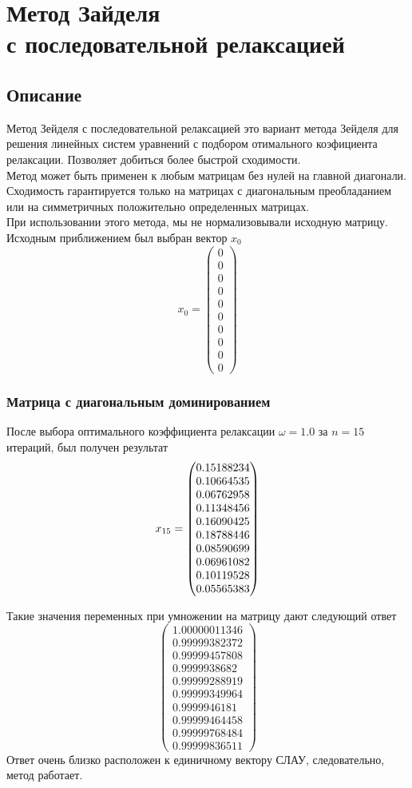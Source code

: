 \documentclass[../../report.tex]{subfiles}
\begin{document}
\chapter[Метод Зайделя с последовательной релаксацией]{\texorpdfstring{Метод Зайделя \\
с последовательной релаксацией}{Метод Зайделя с последовательной релаксацией}}

\section{Описание}
Метод Зейделя с последовательной релаксацией это вариант метода Зейделя для решения линейных систем
уравнений с подбором отимального коэфициента релаксации. Позволяет добиться  более быстрой сходимости. \\

Метод может быть применен к любым матрицам без нулей на главной диагонали. Сходимость гарантируется только на
матрицах с диагональным преобладанием или на симметричных положительно определенных матрицах. \\

При использовании этого метода, мы не нормализовывали исходную матрицу. \\

Исходным приближением был выбран вектор $x_0$
\[
x_0 = \begin{pmatrix}
    0 \\
    0 \\
    0 \\
    0 \\
    0 \\
    0 \\
    0 \\
    0 \\
    0 \\
    0
\end{pmatrix}
\]

\subsection{Матрица с диагональным доминированием}
После выбора оптимального коэффициента релаксации \(\omega = 1.0\) за
\(n=15\) итераций, был получен результат
\[
x_{15} = \begin{pmatrix} 0.15188234 \\ 0.10664535 \\ 0.06762958 \\ 0.11348456 \\ 0.16090425 \\ 0.18788446 \\ 0.08590699 \\ 0.06961082 \\ 0.10119528 \\ 0.05565383 \end{pmatrix}
\]

Такие значения переменных при умножении на матрицу дают следующий ответ
\[
\begin{pmatrix}
    1.00000011346 \\
    0.99999382372 \\
    0.99999457808 \\
    0.9999938682 \\
    0.99999288919 \\
    0.99999349964 \\
    0.9999946181 \\
    0.99999464458 \\
    0.99999768484 \\
    0.99999836511
\end{pmatrix}
\]
Ответ очень близко расположен к единичному вектору СЛАУ, следовательно, метод работает.
\end{document}
